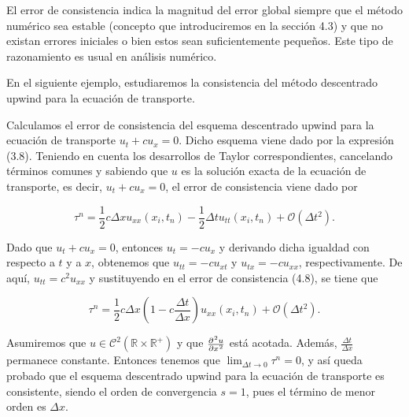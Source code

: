 \begin{remark}
  El error de consistencia indica la magnitud del error global
  siempre que el método numérico sea estable
  (concepto que introduciremos en la sección 4.3) y que no existan
  errores iniciales o bien estos sean suficientemente pequeños.
  Este tipo de razonamiento es usual en análisis numérico.
\end{remark}

En el siguiente ejemplo, estudiaremos la consistencia del método
descentrado upwind para la ecuación de transporte.

\begin{example}
  Calculamos el error de consistencia del esquema descentrado upwind
  para la ecuación de transporte
  \begin{math}
    u_{t}+
    cu_{x}=
    0.
  \end{math}
  Dicho esquema viene dado por la expresión (3.8).
  Teniendo en cuenta los desarrollos de Taylor correspondientes,
  cancelando términos comunes y sabiendo que $u$ es la solución
  exacta de la ecuación de transporte, es decir,
  $u_{t}+cu_{x}=0$, el error de consistencia viene dado por

  \begin{equation*}
    \tau^{n}=
    \frac{1}{2}
    c\Delta x
    u_{xx}
    \left(x_{i},t_{n}\right)-
    \frac{1}{2}\Delta t
    u_{tt}
    \left(x_{i},t_{n}\right)+
    \mathcal{O}
    \left(\Delta t^{2}\right).
  \end{equation*}

  Dado que $u_{t}+cu_{x}=0$, entonces $u_{t}=-cu_{x}$ y derivando
  dicha igualdad con respecto a $t$ y a $x$, obtenemos que
  $u_{tt}=-cu_{xt}$ y $u_{tx}=-cu_{xx}$, respectivamente.
  De aquí, $u_{tt}=c^{2}u_{xx}$ y sustituyendo en el error de
  consistencia (4.8), se tiene que

  \begin{equation*}
    \tau^{n}=
    \frac{1}{2}
    c\Delta x
    \left(
    1-c\frac{\Delta t}{\Delta x}
    \right)
    u_{xx}
    \left(x_{i},t_{n}\right)+
    \mathcal{O}
    \left(\Delta t^{2}\right).
  \end{equation*}

  Asumiremos que
  \begin{math}
    u\in
    \mathcal{C}^{2}
    \left(
    \mathbb{R}\times
    \mathbb{R}^{+}
    \right)
  \end{math}
  y que $\diffp[2]{u}{x}$ está acotada.
  Además, $\frac{\Delta t}{\Delta x}$ permanece constante.
  Entonces tenemos que $\lim_{\Delta t\to0}\tau^{n}=0$, y así queda
  probado que el esquema descentrado upwind para la
  ecuación de transporte es consistente, siendo el orden de
  convergencia $s=1$, pues el término de menor orden es $\Delta x$.
\end{example}

